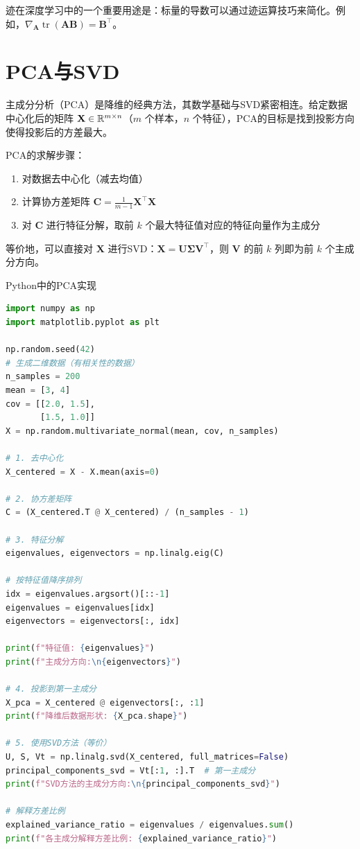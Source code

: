 迹在深度学习中的一个重要用途是：标量的导数可以通过迹运算技巧来简化。例如，$\nabla_{\mathbf{A}}\operatorname{tr}(\mathbf{A}\mathbf{B})=\mathbf{B}^{\top}$。

\section{PCA与SVD}

主成分分析（PCA）是降维的经典方法，其数学基础与SVD紧密相连。给定数据中心化后的矩阵 $\mathbf{X}\in\mathbb{R}^{m\times n}$（$m$ 个样本，$n$ 个特征），PCA的目标是找到投影方向使得投影后的方差最大。

PCA的求解步骤：
\begin{enumerate}
    \item 对数据去中心化（减去均值）
    \item 计算协方差矩阵 $\mathbf{C}=\frac{1}{m-1}\mathbf{X}^{\top}\mathbf{X}$
    \item 对 $\mathbf{C}$ 进行特征分解，取前 $k$ 个最大特征值对应的特征向量作为主成分
\end{enumerate}

等价地，可以直接对 $\mathbf{X}$ 进行SVD：$\mathbf{X}=\mathbf{U}\boldsymbol{\Sigma}\mathbf{V}^{\top}$，则 $\mathbf{V}$ 的前 $k$ 列即为前 $k$ 个主成分方向。

\begin{mycode}{Python中的PCA实现}
\begin{lstlisting}[language=Python]
import numpy as np
import matplotlib.pyplot as plt

np.random.seed(42)
# 生成二维数据（有相关性的数据）
n_samples = 200
mean = [3, 4]
cov = [[2.0, 1.5],
       [1.5, 1.0]]
X = np.random.multivariate_normal(mean, cov, n_samples)

# 1. 去中心化
X_centered = X - X.mean(axis=0)

# 2. 协方差矩阵
C = (X_centered.T @ X_centered) / (n_samples - 1)

# 3. 特征分解
eigenvalues, eigenvectors = np.linalg.eig(C)

# 按特征值降序排列
idx = eigenvalues.argsort()[::-1]
eigenvalues = eigenvalues[idx]
eigenvectors = eigenvectors[:, idx]

print(f"特征值: {eigenvalues}")
print(f"主成分方向:\n{eigenvectors}")

# 4. 投影到第一主成分
X_pca = X_centered @ eigenvectors[:, :1]
print(f"降维后数据形状: {X_pca.shape}")

# 5. 使用SVD方法（等价）
U, S, Vt = np.linalg.svd(X_centered, full_matrices=False)
principal_components_svd = Vt[:1, :].T  # 第一主成分
print(f"SVD方法的主成分方向:\n{principal_components_svd}")

# 解释方差比例
explained_variance_ratio = eigenvalues / eigenvalues.sum()
print(f"各主成分解释方差比例: {explained_variance_ratio}")
\end{lstlisting}
\end{mycode}

